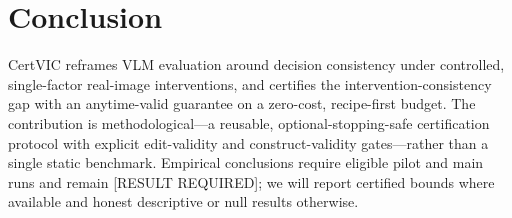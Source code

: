 \section{Conclusion}

CertVIC reframes VLM evaluation around decision consistency under controlled,
single-factor real-image interventions, and certifies the
intervention-consistency gap with an anytime-valid guarantee on a zero-cost,
recipe-first budget. The contribution is methodological---a reusable,
optional-stopping-safe certification protocol with explicit edit-validity and
construct-validity gates---rather than a single static benchmark. Empirical
conclusions require eligible pilot and main runs and remain [RESULT REQUIRED]; we
will report certified bounds where available and honest descriptive or null
results otherwise.
